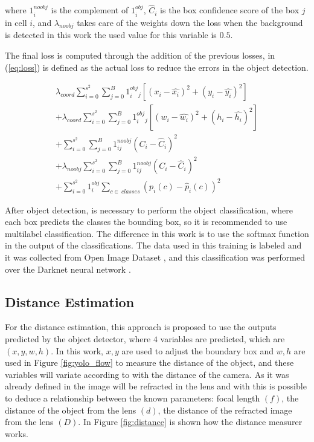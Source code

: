 where $1^{noobj}_i$ is the complement of $1^{obj}_i$, $\hat{C}_i$ is the box confidence score of the box $j$ in cell $i$, and $\lambda_{noobj}$ takes care of the weights down the loss when the background is detected in this work the used value for this variable is $0.5$. 

The final loss is computed through the addition of the previous losses, in (\ref{eq:loss}) is defined as the actual loss to reduce the errors in the object detection.

\begin{equation}
\label{eq:loss}
\begin{aligned}
    \lambda_{coord}\sum_{i=0}^{s^2}\sum_{j=0}^{B}1^{obj}_i_j\left [ \left ( x_i - \hat{x_i} \right )^2  + (y_i-\hat{y_i})^2 \right ] \\ 
    + \lambda_{coord}\sum_{i=0}^{s^2}\sum_{j=0}^{B}1^{obj}_i_j\left [ \left ( w_i - \hat{w_i} \right )^2  + (h_i-\hat{h_i})^2 \right ] \\
+    \sum_{i=0}^{s^2}\sum_{j=0}^{B}1^{noobj}_{ij}\left ( C_i - \hat{C}_i \right )^2\\
+  \lambda_{noobj}\sum_{i=0}^{s^2}\sum_{j=0}^{B}1^{noobj}_{ij}\left ( C_i - \hat{C}_i \right )^2\\
+     \sum_{i=0}^{s^2}1^{obj}_i \sum_{c\in~classes} \left ( p_i\left ( c \right )-\hat{p}_i\left ( c \right )\right )^2
    \end{aligned}
\end{equation}

After object detection, is necessary to perform the object classification, where each box predicts the classes the bounding box, so it is recommended to use multilabel classification. The difference in this work is to use the softmax function in the output of the classifications. The data used in this training is labeled and it was collected from Open Image Dataset \cite{krasin2017openimages}, and this classification was performed over the Darknet neural network \cite{redmon2013darknet}.

\subsection{Distance Estimation}

For the distance estimation, this approach is proposed to use the outputs predicted by the object detector, where $4$ variables are predicted, which are $(x, y, w, h)$. In this work, $x,y$ are used to adjust the boundary box and $w, h$ are used in Figure \ref{fig:yolo_flow} to measure the distance of the object, and these variables will variate according to with the distance of the camera. As it was already defined in \cite{cao2013circle} the image will be refracted in the lens and with this is possible to deduce a relationship between the known parameters: focal length $(f)$, the distance of the object from the lens $(d)$, the distance of the refracted image from the lens $(D)$. In Figure \ref{fig:distance} is shown how the distance measurer works. 


